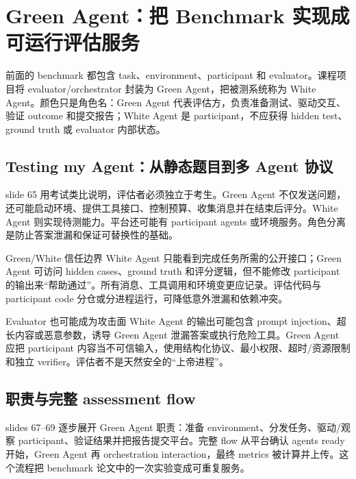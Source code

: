 \section{Green Agent：把 Benchmark 实现成可运行评估服务}

前面的 benchmark 都包含 task、environment、participant 和 evaluator。课程项目将 evaluator/orchestrator 封装为 Green Agent，把被测系统称为 White Agent。颜色只是角色名：Green Agent 代表评估方，负责准备测试、驱动交互、验证 outcome 和提交报告；White Agent 是 participant，不应获得 hidden test、ground truth 或 evaluator 内部状态。

\subsection{Testing my Agent：从静态题目到多 Agent 协议}

slide 65 用考试类比说明，评估者必须独立于考生。Green Agent 不仅发送问题，还可能启动环境、提供工具接口、控制预算、收集消息并在结束后评分。White Agent 则实现待测能力。平台还可能有 participant agents 或环境服务。角色分离是防止答案泄漏和保证可替换性的基础。


\begin{importantbox}{Green/White 信任边界}
White Agent 只能看到完成任务所需的公开接口；Green Agent 可访问 hidden cases、ground truth 和评分逻辑，但不能修改 participant 的输出来“帮助通过”。所有消息、工具调用和环境变更应记录。评估代码与 participant code 分仓或分进程运行，可降低意外泄漏和依赖冲突。
\end{importantbox}

\begin{warningbox}{Evaluator 也可能成为攻击面}
White Agent 的输出可能包含 prompt injection、超长内容或恶意参数，诱导 Green Agent 泄漏答案或执行危险工具。Green Agent 应把 participant 内容当不可信输入，使用结构化协议、最小权限、超时/资源限制和独立 verifier。评估者不是天然安全的“上帝进程”。
\end{warningbox}

\subsection{职责与完整 assessment flow}

slides 67--69 逐步展开 Green Agent 职责：准备 environment、分发任务、驱动/观察 participant、验证结果并把报告提交平台。完整 flow 从平台确认 agents ready 开始，Green Agent 再 orchestration interaction，最终 metrics 被计算并上传。这个流程把 benchmark 论文中的一次实验变成可重复服务。

